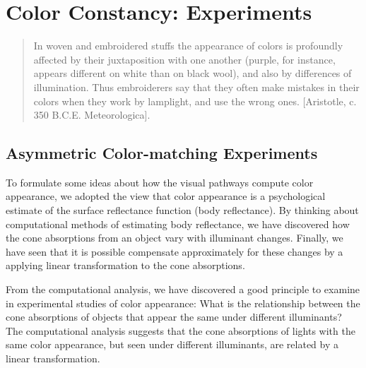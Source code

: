 \newcommand{\match}{\mbox{${\bf m}$}}
\newcommand{\matchi}[1]{\mbox{${\bf m}_{#1}$}}

\section{Color Constancy: Experiments}

\begin{quote}
In woven and embroidered stuffs the appearance of colors is profoundly
affected by their juxtaposition with one another (purple, for
instance, appears different on white than on black wool), and also by
differences of illumination.  Thus embroiderers say that they often
make mistakes in their colors when they work by lamplight, and use the
wrong ones.  [Aristotle, c. 350 B.C.E. Meteorologica].
\end{quote}

\subsection*{Asymmetric Color-matching Experiments}

To formulate some ideas about how the visual pathways compute color
appearance, we adopted the view that color appearance is a
psychological estimate of the surface reflectance function (body
reflectance).  By thinking about computational methods of estimating
body reflectance, we have discovered how the cone absorptions from an
object vary with illuminant changes.  Finally, we have seen that it is
possible compensate approximately for these changes by a applying
linear transformation to the cone absorptions.

From the computational analysis, we have discovered a good principle
to examine in experimental studies of color appearance: What is the
relationship between the cone absorptions of objects that appear the
same under different illuminants?  The computational analysis suggests
that the cone absorptions of lights with the same color appearance,
but seen under different illuminants, are related by a linear
transformation.

